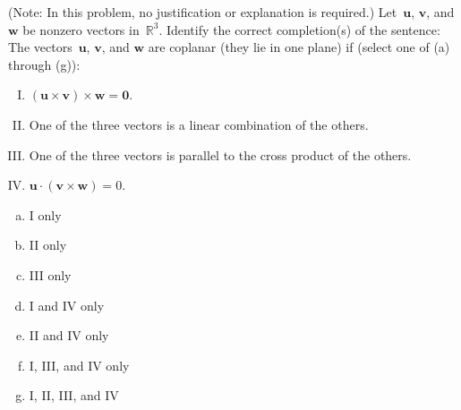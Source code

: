 \documentclass[11pt]{exam}
\newcommand{\R}{\mathbb{R}}
\begin{document}
\begin{questions}
\question[8] (Note: In this problem, no justification or explanation is required.) Let~$\mathbf{u}$, $\mathbf{v}$, and $\mathbf{w}$ be nonzero vectors in~$\R^3$. Identify the correct completion(s) of the sentence: The vectors~$\mathbf{u}$, $\mathbf{v}$, and $\mathbf{w}$ are coplanar (they lie in one plane) if (select one of (a) through (g)):

\begin{enumerate}[I.]
    \item $(\mathbf{u} \times \mathbf{v}) \times \mathbf{w} = \mathbf{0}$.
    \item One of the three vectors is a linear combination of the others.
    \item One of the three vectors is parallel to the cross product of the others.
    \item $\mathbf{u} \cdot (\mathbf{v} \times \mathbf{w}) = 0$.
\end{enumerate}

\begin{enumerate}[a.]
    \item I only
    \item II only
    \item III only
    \item I and IV only
    \item II and IV only
    \item I, III, and IV only
    \item I, II, III, and IV
\end{enumerate}

\end{questions}
\end{document}
